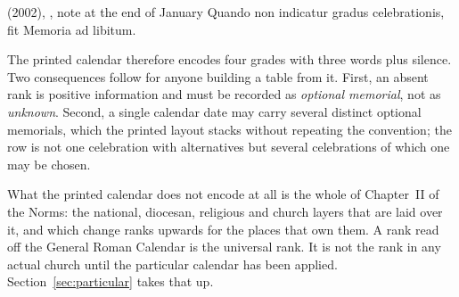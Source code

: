 \begin{normtext}{ (2002), , note at the end of January}
Quando non indicatur gradus celebrationis, fit Memoria ad libitum.
\end{normtext}

The printed calendar therefore encodes four grades with three words plus silence. Two consequences
follow for anyone building a table from it. First, an absent rank is positive information and must
be recorded as \emph{optional memorial}, not as \emph{unknown}. Second, a single calendar date may
carry several distinct optional memorials, which the printed layout stacks without repeating the
convention; the row is not one celebration with alternatives but several celebrations of which one
may be chosen.

What the printed calendar does not encode at all is the whole of Chapter~II of the Norms: the
national, diocesan, religious and church layers that are laid over it, and which change ranks
upwards for the places that own them. A rank read off the General Roman Calendar is the universal
rank. It is not the rank in any actual church until the particular calendar has been applied.
Section~\ref{sec:particular} takes that up.
